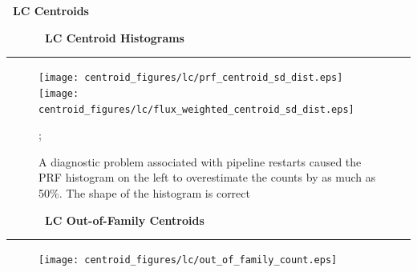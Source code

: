 \vspace{2in}
\centering
{\Huge {\bf \quarter\ LC Centroids}}




\cleardoublepage
\begin{figure}[h!]
  \centering
  \hfill
  {\Huge {\bf \quarter\ LC Centroid Histograms}}
  \hfill
\end{figure}
\hrule

\begin{figure}[h!]
  \centering
  \texttt{[image: centroid\_figures/lc/prf\_centroid\_sd\_dist.eps]}
  \texttt{[image: centroid\_figures/lc/flux\_weighted\_centroid\_sd\_dist.eps]}
  \caption{A diagnostic problem associated with pipeline restarts caused the PRF histogram
  on the left to overestimate the counts by as much as 50\%.  The shape of the histogram is correct};
\end{figure}



\cleardoublepage
\begin{figure}[h!]
  \centering
  \hfill
  {\Huge {\bf \quarter\ LC Out-of-Family Centroids}}
  \hfill
\end{figure}
\hrule

\begin{figure}[h!]
  \centering
  \texttt{[image: centroid\_figures/lc/out\_of\_family\_count.eps]}
\end{figure}


